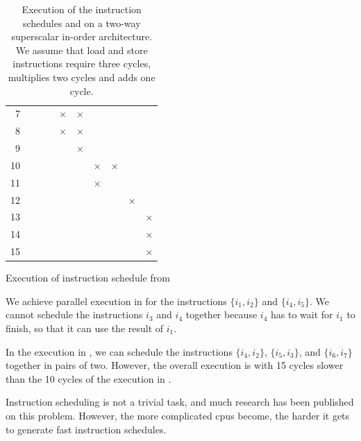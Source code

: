 \begin{table}
\begin{subtable}{0.48\textwidth}
\begin{tabular}{rccccccccc}
             7 &   &   &   &$\boldsymbol{\times}$&$\boldsymbol{\times}$&   &   &   &   \\ \rowcolor[gray]{.975}
             8 &   &   &   &$\boldsymbol{\times}$&$\boldsymbol{\times}$&   &   &   &   \\
             9 &   &   &   &   &$\boldsymbol{\times}$&   &   &   &   \\ \rowcolor[gray]{.975}
            10 &   &   &   &   &   &$\boldsymbol{\times}$&$\boldsymbol{\times}$&   &   \\
            11 &   &   &   &   &   &$\boldsymbol{\times}$&   &   &   \\ \rowcolor[gray]{.975}
            12 &   &   &   &   &   &   &   &$\boldsymbol{\times}$&   \\
            13 &   &   &   &   &   &   &   &   &$\boldsymbol{\times}$\\ \rowcolor[gray]{.975}
            14 &   &   &   &   &   &   &   &   &$\boldsymbol{\times}$\\
            15 &   &   &   &   &   &   &   &   &$\boldsymbol{\times}$\\
            \bottomrule
        \end{tabular}
        \caption{Execution of instruction schedule from }
        \label{tbl:bg:schedule-comparison-b}
    \end{subtable}
    \caption[Schedule comparison on a two-way superscalar in-order architecture]{Execution of the instruction schedules  and  on a two-way superscalar in-order architecture. 
    We assume that load and store instructions require three cycles, multiplies two cycles and adds one cycle.}
    \label{tbl:bg:schedule-comparison}
\end{table}

We achieve parallel execution in  for the instructions $\{i_1, i_2\}$ and $\{i_4, i_5\}$.
We cannot schedule the instructions $i_3$ and $i_4$ together because $i_4$ has to wait for $i_1$ to finish, so that it can use the result of $i_1$.

In the execution in , we can schedule the instructions $\{i_4, i_2\}$, $\{i_5, i_3\}$, and $\{i_6, i_7\}$ together in pairs of two.
However, the overall execution is with 15 cycles slower than the 10 cycles of the execution in .

Instruction scheduling is not a trivial task, and much research has been published on this problem.
However, the more complicated \acp{cpu} become, the harder it gets to generate fast instruction schedules.

